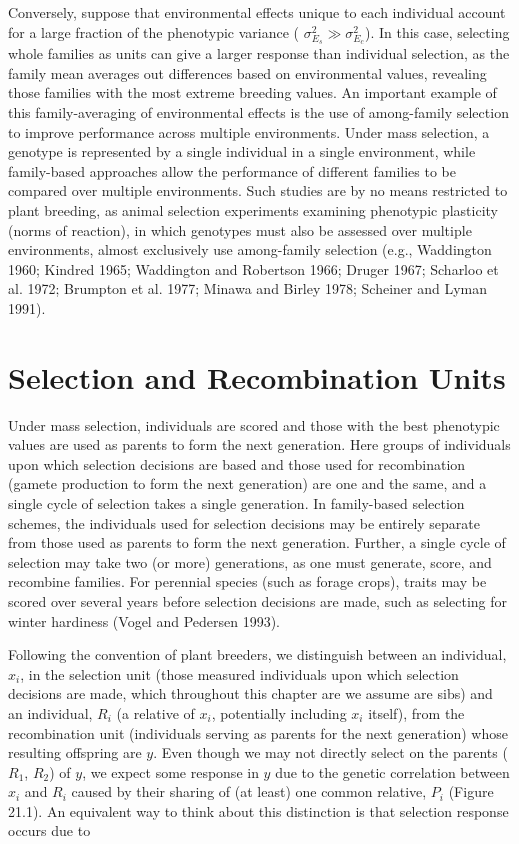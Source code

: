 \documentclass{article}
\begin{document}
Conversely, suppose that environmental effects unique to each individual account for a large fraction of the phenotypic variance ( $ \sigma_{E_s}^2 \gg \sigma_{E_c}^2 $). In this case, selecting whole families as units can give a larger response than individual selection, as the family mean averages out differences based on environmental values, revealing those families with the most extreme breeding values. An important example of this family-averaging of environmental effects is the use of among-family selection to improve performance across multiple environments. Under mass selection, a genotype is represented by a single individual in a single environment, while family-based approaches allow the performance of different families to be compared over multiple environments. Such studies are by no means restricted to plant breeding, as animal selection experiments examining phenotypic plasticity (norms of reaction), in which genotypes must also be assessed over multiple environments, almost exclusively use among-family selection (e.g., Waddington 1960; Kindred 1965; Waddington and Robertson 1966; Druger 1967; Scharloo et al. 1972; Brumpton et al. 1977; Minawa and Birley 1978; Scheiner and Lyman 1991).

\section{Selection and Recombination Units}
Under mass selection, individuals are scored and those with the best phenotypic values are used as parents to form the next generation. Here groups of individuals upon which selection decisions are based and those used for recombination (gamete production to form the next generation) are one and the same, and a single cycle of selection takes a single generation. In family-based selection schemes, the individuals used for selection decisions may be entirely separate from those used as parents to form the next generation. Further, a single cycle of selection may take two (or more) generations, as one must generate, score, and recombine families. For perennial species (such as forage crops), traits may be scored over several years before selection decisions are made, such as selecting for winter hardiness (Vogel and Pedersen 1993).

Following the convention of plant breeders, we distinguish between an individual,  $ x_i $, in the selection unit (those measured individuals upon which selection decisions are made, which throughout this chapter are we assume are sibs) and an individual,  $ R_i $ (a relative of  $ x_i $, potentially including  $ x_i $ itself), from the recombination unit (individuals serving as parents for the next generation) whose resulting offspring are  $ y $. Even though we may not directly select on the parents ( $ R_1 $,  $ R_2 $) of  $ y $, we expect some response in  $ y $ due to the genetic correlation between  $ x_i $ and  $ R_i $ caused by their sharing of (at least) one common relative,  $ P_i $ (Figure 21.1). An equivalent way to think about this distinction is that selection response occurs due to
\end{document}
